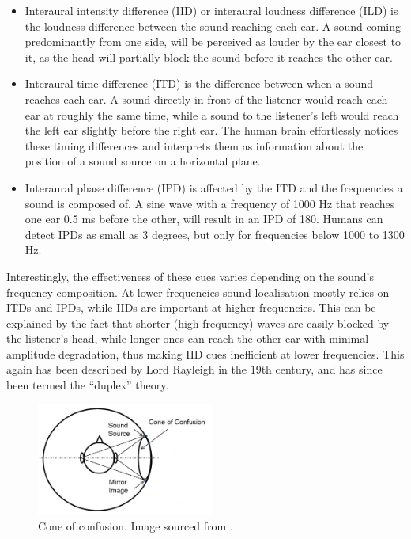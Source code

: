 \begin{itemize}
    \item Interaural intensity difference (IID) or interaural loudness difference (ILD) 
    is the loudness difference between the sound reaching each ear.
    A sound coming predominantly from one side, will be perceived as louder by the ear closest to it,
    as the head will partially block the sound before it reaches the other ear.

    \item Interaural time difference (ITD) is the difference between when a sound reaches each ear. 
    A sound directly in front of the listener would reach each ear at roughly the same time,
    while a sound to the listener's left would reach the left ear slightly before the right ear. 
    The human brain effortlessly notices these timing differences and interprets 
    them as information about the position of a sound source on a horizontal plane. 

    \item Interaural phase difference (IPD) is affected by the ITD and the frequencies a sound is composed of.
    A sine wave with a frequency of 1000 Hz that reaches one ear 0.5 ms before the other, will result in an IPD of 180\degree{}.
    Humans can detect IPDs as small as 3 degrees, but only for frequencies below 1000 to 1300 Hz. \cite{new_realities_in_audio} %
\end{itemize}

Interestingly, the effectiveness of these cues
varies depending on the sound's frequency composition. At lower frequencies sound
localisation mostly relies on ITDs and IPDs, while IIDs are important at higher frequencies. 
This can be explained by the fact that shorter (high frequency) waves are easily blocked by the listener's head,
while longer ones can reach the other ear with minimal amplitude degradation,
thus making IID cues inefficient at lower frequencies.
This again has been described by Lord Rayleigh in the 19th century, and has since been termed the ``duplex'' theory.
\cite{localization_clinical_neurology}\cite{on_our_perception_of_dir_of_sound}

\begin{figure}[!ht]
    \begin{center}
        \hspace{4em}
        \includegraphics[height=10em]{images/human_hearing/cone_of_confusion.jpeg}       
        \caption{Cone of confusion. Image sourced from \cite{cone_of_conf_img_src}. \label{fig:cone_of_confusion}}    
    \end{center}
\end{figure}

